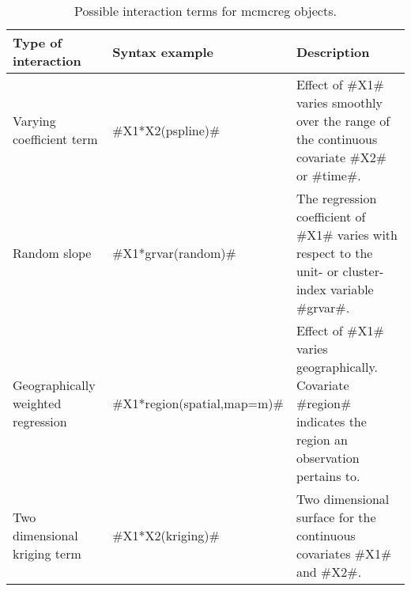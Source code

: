 \begin{table}[ht] \footnotesize
\begin{center}
\begin{tabular}{|p{3.5cm}|p{3.8cm}|p{5.9cm}|}
\hline
{\bf Type of interaction} & {\bf Syntax example} & {\bf Description} \\
\hline
\hline
Varying coefficient term &  #X1*X2(pspline)#
 & Effect of
#X1# varies smoothly over the range of the continuous covariate #X2# or #time#. \\
\hline Random slope & #X1*grvar(random)#  &  The regression
coefficient of #X1# varies with respect
to the unit- or cluster-index variable #grvar#. \\
\hline Geographically weighted \newline regression &
#X1*region(spatial,map=m)#  & Effect of #X1# varies
geographically. Covariate
#region# indicates the region an observation pertains to. \\
\hline Two dimensional \newline kriging term &  #X1*X2(kriging)#
& Two dimensional surface for the continuous
covariates #X1# and #X2#. \\
 \hline
\end{tabular}
{\em\caption {\label{mcmcreginteractions} Possible interaction terms for mcmcreg objects.}}
\end{center}
\end{table}










